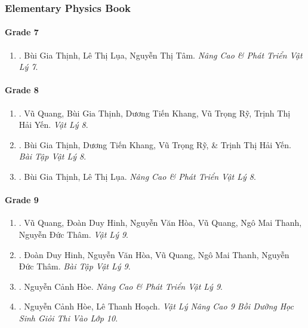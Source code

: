 \documentclass{article}
\begin{document}
\subsubsection{Elementary Physics Book}

\paragraph{Grade 7}

\begin{enumerate}
	\item \cite{Thinh_Lua_ncpt_Vat_Ly_7}. Bùi Gia Thịnh, Lê Thị Lụa, Nguyễn Thị Tâm. {\it Nâng Cao \& Phát Triển Vật Lý 7}.\hfill{\sf[reading]}
\end{enumerate}

\paragraph{Grade 8}

\begin{enumerate}
	\item \cite{SGK_Vat_Ly_8}. Vũ Quang, Bùi Gia Thịnh, Dương Tiến Khang, Vũ Trọng Rỹ, Trịnh Thị Hải Yến. {\it Vật Lý 8}.\hfill{\sf[reading]}
	
	\item \cite{SBT_Vat_Ly_8}. Bùi Gia Thịnh, Dương Tiến Khang, Vũ Trọng Rỹ, \& Trịnh Thị Hải Yến. {\it Bài Tập Vật Lý 8}.\hfill{\sf[reading]}
	
	\item \cite{Thinh_Lua_ncpt_Vat_Ly_8}. Bùi Gia Thịnh, Lê Thị Lụa. {\it Nâng Cao \& Phát Triển Vật Lý 8}.\hfill{\sf[reading]}
\end{enumerate}

\paragraph{Grade 9}

\begin{enumerate}
	\item \cite{SGK_Vat_Ly_9}. Vũ Quang, Đoàn Duy Hinh, Nguyễn Văn Hòa, Vũ Quang, Ngô Mai Thanh, Nguyễn Đức Thâm. {\it Vật Lý 9}.\hfill{\sf[reading]}
	
	\item \cite{SBT_Vat_Ly_9}. Đoàn Duy Hinh, Nguyễn Văn Hòa, Vũ Quang, Ngô Mai Thanh, Nguyễn Đức Thâm. {\it Bài Tập Vật Lý 9}.\hfill{\sf[reading]}
	
	\item \cite{Hoe_Vat_Ly_9}. Nguyễn Cảnh Hòe. {\it Nâng Cao \& Phát Triển Vật Lý 9}.\hfill{\sf[reading]}
	
	\item \cite{Hoe_Hoach_Vat_Ly_nang_cao_9}. Nguyễn Cảnh Hòe, Lê Thanh Hoạch. {\it Vật Lý Nâng Cao 9 Bồi Dưỡng Học Sinh Giỏi Thi Vào Lớp 10}.\hfill{\sf[reading]}
\end{enumerate}
\end{document}
